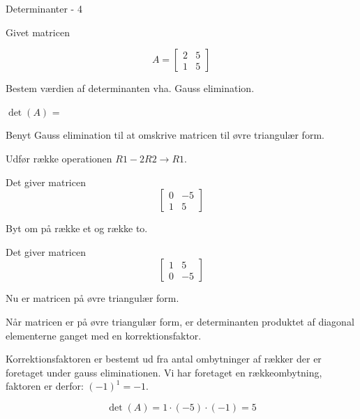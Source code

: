 \documentclass{article}
\begin{document}
\begin{exercise}{Determinanter - 4}
	
Givet matricen

\[
A = \left[\begin{array}{rr}
2 & 5 \\ 
1 & 5 
\end{array} \right]
\]
	
Bestem værdien af determinanten vha. Gauss elimination.

$\det(A)$ = 

\hint
Benyt Gauss elimination til at omskrive matricen til 
øvre triangulær form.

\hint
Udfør række operationen
$R1 - 2 R2 \to R1$.

\hint
Det giver matricen
\[
\left[\begin{array}{rr}
0 & -5 \\ 
1 & 5 
\end{array} \right]
\]
	
\hint
Byt om på række et og række to.

\hint
Det giver matricen
\[
\left[\begin{array}{rr}
1 & 5 \\
0 & -5
\end{array} \right]
\]

\hint
Nu er matricen på øvre triangulær form.

\hint
Når matricen er på øvre triangulær form, er determinanten 
produktet af diagonal elementerne ganget med en korrektionsfaktor.

\hint
Korrektionsfaktoren er bestemt ud fra antal ombytninger af rækker
der er foretaget under gauss eliminationen.
Vi har foretaget en rækkeombytning, faktoren er derfor: $(-1)^1 = -1$.

\hint
\[
\det(A) = 1 \cdot (-5) \cdot (-1) = 5
\]
	
\end{exercise}
\end{document}
